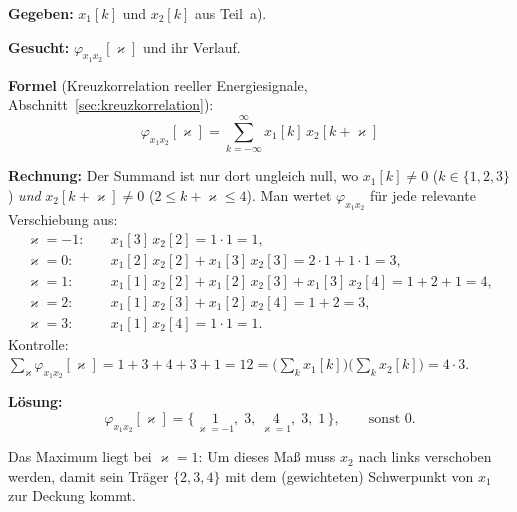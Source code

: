 \begin{beispiel}

\textbf{Gegeben:} $x_1[k]$ und $x_2[k]$ aus Teil~a).

\textbf{Gesucht:} $\varphi_{x_1 x_2}[\varkappa]$ und ihr Verlauf.

\textbf{Formel} (Kreuzkorrelation reeller Energiesignale, Abschnitt~\ref{sec:kreuzkorrelation}):
$$
\varphi_{x_1 x_2}[\varkappa] = \sum_{k=-\infty}^{\infty} x_1[k]\,x_2[k+\varkappa]
$$

\textbf{Rechnung:}
Der Summand ist nur dort ungleich null, wo $x_1[k]\neq 0$ ($k\in\{1,2,3\}$)
\emph{und} $x_2[k+\varkappa]\neq 0$ ($2\leq k+\varkappa\leq 4$). Man wertet
$\varphi_{x_1 x_2}$ für jede relevante Verschiebung aus:
$$
\begin{aligned}
\varkappa=-1:&\quad x_1[3]\,x_2[2] = 1\cdot 1 = 1,\\
\varkappa=0:&\quad x_1[2]\,x_2[2] + x_1[3]\,x_2[3] = 2\cdot 1 + 1\cdot 1 = 3,\\
\varkappa=1:&\quad x_1[1]\,x_2[2] + x_1[2]\,x_2[3] + x_1[3]\,x_2[4] = 1 + 2 + 1 = 4,\\
\varkappa=2:&\quad x_1[1]\,x_2[3] + x_1[2]\,x_2[4] = 1 + 2 = 3,\\
\varkappa=3:&\quad x_1[1]\,x_2[4] = 1\cdot 1 = 1.
\end{aligned}
$$
Kontrolle: $\sum_\varkappa \varphi_{x_1 x_2}[\varkappa] = 1+3+4+3+1 = 12
= \big(\textstyle\sum_k x_1[k]\big)\big(\sum_k x_2[k]\big) = 4\cdot 3$. \checkmark

\textbf{Lösung:}
$$
\boxed{\;\varphi_{x_1 x_2}[\varkappa] = \{\,\underset{\varkappa=-1}{1},\;3,\;\underset{\varkappa=1}{4},\;3,\;1\,\},\qquad
\text{sonst }0.\;}
$$

\begin{center}
\end{center}

Das Maximum liegt bei $\varkappa=1$: Um dieses Maß muss $x_2$ nach links
verschoben werden, damit sein Träger $\{2,3,4\}$ mit dem (gewichteten)
Schwerpunkt von $x_1$ zur Deckung kommt.

\end{beispiel}

